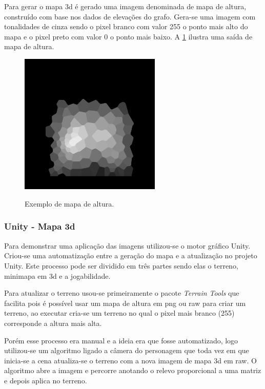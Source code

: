 Para gerar o mapa 3d é gerado uma imagem denominada de mapa de altura, construído com base nos dados de elevações do grafo. Gera-se uma imagem com tonalidades de cinza sendo o pixel branco com valor 255 o ponto mais alto do mapa e o pixel preto com valor 0 o ponto mais baixo. A \cref{fig:heightmap} ilustra uma saída de mapa de altura.

\begin{figure}[!ht]
	\centering
    \caption{Exemplo de mapa de altura.}
	\includegraphics[width=0.6\textwidth]{figures/heightmap_eample.png}
	\label{fig:heightmap}
\end{figure}

\subsubsection{Unity - Mapa 3d}

Para demonstrar uma aplicação das imagens utilizou-se o motor gráfico Unity. Criou-se uma automatização entre a geração do mapa e a atualização no projeto Unity. Este processo pode ser dividido em três partes sendo elas o terreno, minimapa em 3d e a jogabilidade.


Para atualizar o terreno usou-se primeiramente o pacote \textit{Terrain Tools} que facilita pois é possível usar um mapa de altura em png ou raw para criar um terreno, ao executar cria-se um terreno no qual o pixel mais branco (255) corresponde a altura mais alta.

Porém esse processo era manual e a ideia era que fosse automatizado, logo utilizou-se um algoritmo ligado a câmera do personagem que toda vez em que inicia-se a cena atualiza-se o terreno com a nova imagem de mapa 3d em raw. O algoritmo abre a imagem e percorre anotando o relevo proporcional a uma matriz e depois aplica no terreno.

